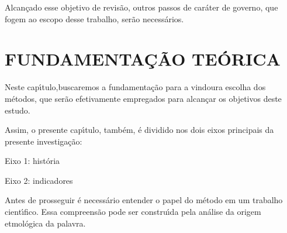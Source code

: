 \documentclass[
12pt,		%
openright,	%
twoside,  %
a4paper,			%
chapter=TITLE,		%
english,			%
french,				%
spanish,			%
brazil				%
]{USPSC-classe/USPSC}
\begin{document}
Alcan\c{c}ado esse objetivo de revis\~ao, outros passos de car\'ater de governo, que fogem ao escopo desse trabalho, ser\~ao necess\'arios.









\chapter[FUNDAMENTA\c{C}\~AO TE\'ORICA]{FUNDAMENTA\c{C}\~AO TE\'ORICA}\label{FUNDAMENTA\c{C}\~AO TE\'ORICA}
Neste cap\'{\i}tulo,buscaremos a fundamenta\c{c}\~ao para a vindoura escolha dos m\'etodos, que ser\~ao efetivamente empregados para alcan\c{c}ar os objetivos deste estudo.









Assim, o presente cap\'{\i}tulo, tamb\'em, \'e dividido nos dois eixos principais da presente investiga\c{c}\~ao:










\begin{alineas}
\item Eixo 1: hist\'oria
\item Eixo 2: indicadores
\end{alineas}

Antes de prosseguir \'e necess\'ario entender o papel do m\'etodo em um trabalho cient\'{\i}fico. Essa compreens\~ao pode ser constru\'{\i}da pela an\'alise da origem etmol\'ogica da palavra.










\noindent\begin{center}\mbox{\centering{}}\end{center}
\end{document}
